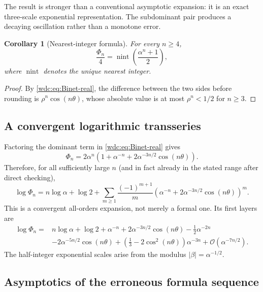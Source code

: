 \documentclass[11pt,letterpaper]{article}
\numberwithin{equation}{section}
\newtheorem{corollary}[theorem]{Corollary}
\theoremstyle{definition}
\newcommand{\bigO}{\mathcal O}
\newcommand{\abs}[1]{\lvert#1\rvert}
\begin{document}
The result is stronger than a conventional asymptotic expansion: it is an
exact three-scale exponential representation.  The subdominant pair produces
a decaying oscillation rather than a monotone error.

\begin{corollary}[Nearest-integer formula]\label{wdc:cor:nearest}
For every $n\ge4$,
\begin{equation}\label{wdc:eq:nearest-quarter}
  \boxed{
  \frac{\Phi_n}{4}
  =\operatorname{nint}\!\left(\frac{\alpha^n+1}{2}\right),}
\end{equation}
where $\operatorname{nint}$ denotes the unique nearest integer.
\end{corollary}

\begin{proof}
By \eqref{wdc:eq:Binet-real}, the difference between the two sides before rounding
is $\rho^n\cos(n\theta)$, whose absolute value is at most $\rho^n<1/2$ for
$n\ge3$.
\end{proof}

\subsection{A convergent logarithmic transseries}

Factoring the dominant term in \eqref{wdc:eq:Binet-real} gives
\begin{equation}\label{wdc:eq:factor-Phi}
 \Phi_n=2\alpha^n
 \left(1+\alpha^{-n}+2\alpha^{-3n/2}\cos(n\theta)\right).
\end{equation}
Therefore, for all sufficiently large $n$ (and in fact already in the stated
range after direct checking),
\begin{equation}\label{wdc:eq:log-all-orders}
 \log\Phi_n
 =n\log\alpha+\log2+
 \sum_{m\ge1}\frac{(-1)^{m+1}}m
 \left(\alpha^{-n}+2\alpha^{-3n/2}\cos(n\theta)\right)^m.
\end{equation}
This is a convergent all-orders expansion, not merely a formal one.  Its first
layers are
\begin{align}
 \log\Phi_n={}&n\log\alpha+\log2
 +\alpha^{-n}+2\alpha^{-3n/2}\cos(n\theta)
 -\frac12\alpha^{-2n}\nonumber\\
 &-2\alpha^{-5n/2}\cos(n\theta)
 +\left(\frac13-2\cos^2(n\theta)\right)\alpha^{-3n}
 +\bigO(\alpha^{-7n/2}).\label{wdc:eq:log-expanded}
\end{align}
The half-integer exponential scales arise from the modulus
$\abs\beta=\alpha^{-1/2}$.

\subsection{Asymptotics of the erroneous formula sequence}
\end{document}
